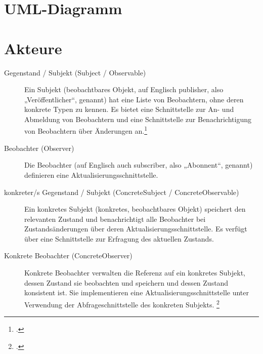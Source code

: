 \documentclass{lehramt-informatik-haupt}
\begin{document}
%

\section{UML-Diagramm}


%

\section{Akteure}

\begin{description}
\item[Gegenstand / Subjekt (Subject / Observable)]

Ein Subjekt (beobachtbares Objekt, auf Englisch publisher, also
„Veröffentlicher“, genannt) hat eine Liste von Beobachtern, ohne deren
konkrete Typen zu kennen. Es bietet eine Schnittstelle zur An- und
Abmeldung von Beobachtern und eine Schnittstelle zur Benachrichtigung
von Beobachtern über Änderungen an.\footcite[Seite 251]{gof}

\item[Beobachter (Observer)]
Die Beobachter (auf Englisch auch subscriber, also „Abonnent“, genannt)
definieren eine Aktualisierungsschnittstelle.

\item[konkreter/s Gegenstand / Subjekt (ConcreteSubject / ConcreteObservable)]

Ein konkretes Subjekt (konkretes, beobachtbares Objekt) speichert den
relevanten Zustand und benachrichtigt alle Beobachter bei
Zustandsänderungen über deren Aktualisierungsschnittstelle. Es verfügt
über eine Schnittstelle zur Erfragung des aktuellen Zustands.

\item[Konkrete Beobachter (ConcreteObserver)]

Konkrete Beobachter verwalten die Referenz auf ein konkretes Subjekt,
dessen Zustand sie beobachten und speichern und dessen Zustand
konsistent ist. Sie implementieren eine Aktualisierungsschnittstelle
unter Verwendung der Abfrageschnittstelle des konkreten Subjekts.
\footcite{wiki:beobachter}
\end{description}
\end{document}
